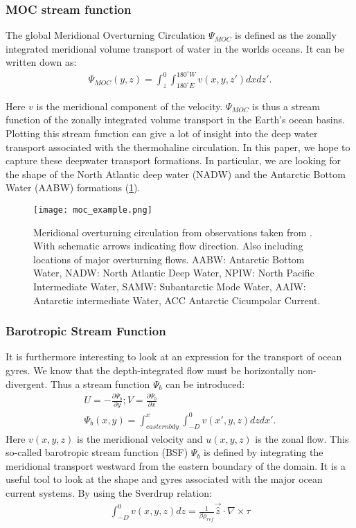 \newpage
\begin{multicols}{2}
\subsubsection{MOC stream function} \label{sec:MOCSTREAM}
The global Meridional Overturning Circulation $\Psi_{MOC}$ is defined as the zonally integrated meridional volume transport of water in the worlds oceans. It can be written down as:
\begin{align}
	\Psi_{MOC}(y,z) = \int_{z}^{0} \int_{180^{\circ}E}^{180^{\circ}W} v(x,y,z') dx dz'.
\end{align}

Here $v$ is the meridional component of the velocity.
$ \Psi_{MOC}$ is thus a stream function of the zonally integrated volume transport in the Earth's ocean basins. Plotting this stream function can give a lot of insight into the deep water transport associated with the thermohaline circulation. In this paper, we hope to capture these deepwater transport formations. In particular, we are looking for the shape of the North Atlantic deep water (NADW) and the Antarctic Bottom Water (AABW) formations (\cref{fig:moc_ex}).

 \begin{figure}[H]
	\texttt{[image: moc\_example.png]}
	\caption{Meridional overturning circulation from observations taken from \cite{Forget2015Oct}. With schematic arrows indicating flow direction. Also including locations of major overturning flows. AABW: Antarctic Bottom Water, NADW: North Atlantic Deep Water, NPIW: North Pacific Intermediate Water,  SAMW: Subantarctic Mode Water, AAIW: Antarctic intermediate Water, ACC Antarctic Cicumpolar Current.}
	\label{fig:moc_ex}
\end{figure}

\subsubsection{Barotropic Stream Function} \label{sec:BSF_theory}
It is furthermore interesting to look at an expression for the transport of ocean gyres. We know that the depth-integrated flow must be horizontally non-divergent. Thus a stream function $\Psi_{b}$ can be introduced:
\begin{align}
U = -\frac{\partial \Psi_{b}}{\partial y}; V=\frac{\partial \Psi_{b}}{\partial x} \label{eq:psiv} \\
\Psi_{b}(x, y) = \int_{eastern bdy}^{x} \int_{-D}^{0} v(x',y,z) dz dx'.
\end{align}
Here $v(x,y,z)$ is the meridional velocity and $u(x,y,z)$ is the zonal flow.
This so-called barotropic stream function (BSF) $\Psi_{b}$ is defined by integrating the meridional transport westward from the eastern boundary of the domain. It is a useful tool to look at the shape and gyres associated with the major ocean current systems. By using the Sverdrup relation:
\begin{align}
	\int_{-D}^{0}v(x,y,z) dz = \frac{1}{\beta \rho_{ref}}\vec{\hat{z}}\cdot \nabla \times \tau
\end{align}


\end{multicols}
